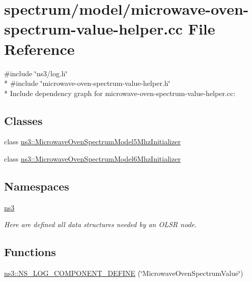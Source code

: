 \hypertarget{microwave-oven-spectrum-value-helper_8cc}{}\section{spectrum/model/microwave-\/oven-\/spectrum-\/value-\/helper.cc File Reference}
\label{microwave-oven-spectrum-value-helper_8cc}
{\ttfamily \#include \char`\"{}ns3/log.\+h\char`\"{}}\\*
{\ttfamily \#include \char`\"{}microwave-\/oven-\/spectrum-\/value-\/helper.\+h\char`\"{}}\\*
Include dependency graph for microwave-\/oven-\/spectrum-\/value-\/helper.cc\+:
\subsection*{Classes}
\begin{DoxyCompactItemize}
\item 
class \hyperlink{classns3_1_1MicrowaveOvenSpectrumModel5MhzInitializer}{ns3\+::\+Microwave\+Oven\+Spectrum\+Model5\+Mhz\+Initializer}
\item 
class \hyperlink{classns3_1_1MicrowaveOvenSpectrumModel6MhzInitializer}{ns3\+::\+Microwave\+Oven\+Spectrum\+Model6\+Mhz\+Initializer}
\end{DoxyCompactItemize}
\subsection*{Namespaces}
\begin{DoxyCompactItemize}
\item 
 \hyperlink{namespacens3}{ns3}
\begin{DoxyCompactList}\small\item\em Here are defined all data structures needed by an O\+L\+SR node. \end{DoxyCompactList}\end{DoxyCompactItemize}
\subsection*{Functions}
\begin{DoxyCompactItemize}
\item 
\hyperlink{namespacens3_a26547552200971b39d2568589f6879c8}{ns3\+::\+N\+S\+\_\+\+L\+O\+G\+\_\+\+C\+O\+M\+P\+O\+N\+E\+N\+T\+\_\+\+D\+E\+F\+I\+NE} (\char`\"{}Microwave\+Oven\+Spectrum\+Value\char`\"{})
\end{DoxyCompactItemize}
